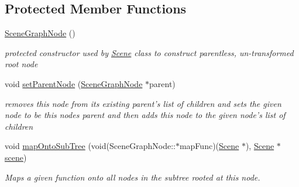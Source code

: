 \subsection*{Protected Member Functions}
\begin{DoxyCompactItemize}
\item 
\hyperlink{classmotorcar_1_1SceneGraphNode_ab9bc5f59ccba332aab918c7b066c309f}{Scene\-Graph\-Node} ()
\begin{DoxyCompactList}\small\item\em protected constructor used by \hyperlink{classmotorcar_1_1Scene}{Scene} class to construct parentless, un-\/transformed root node \end{DoxyCompactList}\item 
void \hyperlink{classmotorcar_1_1SceneGraphNode_a977b156ebcc07018a475b4042de8886a}{set\-Parent\-Node} (\hyperlink{classmotorcar_1_1SceneGraphNode}{Scene\-Graph\-Node} $\ast$parent)
\begin{DoxyCompactList}\small\item\em removes this node from its existing parent's list of children and sets the given node to be this nodes parent and then adds this node to the given node's list of children \end{DoxyCompactList}\item 
void \hyperlink{classmotorcar_1_1SceneGraphNode_a45fc46ec0c27774f31ff7bd0f5e51576}{map\-Onto\-Sub\-Tree} (void(Scene\-Graph\-Node\-::$\ast$map\-Func)(\hyperlink{classmotorcar_1_1Scene}{Scene} $\ast$), \hyperlink{classmotorcar_1_1Scene}{Scene} $\ast$\hyperlink{classmotorcar_1_1SceneGraphNode_aa14e637ed4ae98f77e28941a4b5cfdd8}{scene})
\begin{DoxyCompactList}\small\item\em Maps a given function onto all nodes in the subtree rooted at this node. \end{DoxyCompactList}\end{DoxyCompactItemize}


